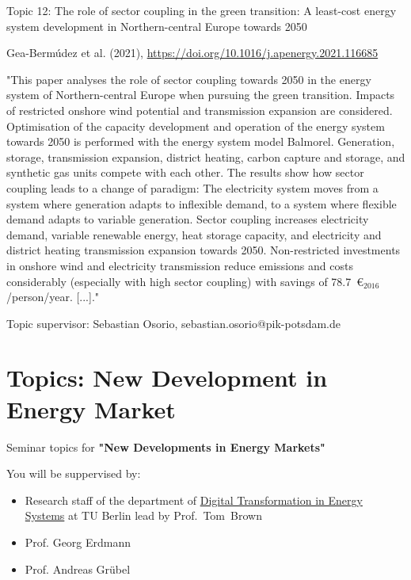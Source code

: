 \documentclass[10pt,aspectratio=169,dvipsnames]{beamer}
\begin{document}
\begin{frame}
  \begin{block}{Topic 12: The role of sector coupling in the green transition: A least-cost energy system development in Northern-central Europe towards 2050}
      
    Gea-Bermúdez et al. (2021), 
    \href{https://doi.org/10.1016/j.apenergy.2021.116685}
    {https://doi.org/10.1016/j.apenergy.2021.116685}
    
    "This paper analyses the role of sector coupling towards 2050 in the energy system of Northern-central Europe when pursuing the green transition. Impacts of restricted onshore wind potential and transmission expansion are considered. Optimisation of the capacity development and operation of the energy system towards 2050 is performed with the energy system model Balmorel. Generation, storage, transmission expansion, district heating, carbon capture and storage, and synthetic gas units compete with each other. The results show how sector coupling leads to a change of paradigm: The electricity system moves from a system where generation adapts to inflexible demand, to a system where flexible demand adapts to variable generation. Sector coupling increases electricity demand, variable renewable energy, heat storage capacity, and electricity and district heating transmission expansion towards 2050. Non-restricted investments in onshore wind and electricity transmission reduce emissions and costs considerably (especially with high sector coupling) with savings of 78.7~€$_{2016}$/person/year. [...]."

    \hfill
    Topic supervisor: Sebastian Osorio, sebastian.osorio@pik-potsdam.de
    
  \end{block}
\end{frame}



\section{Topics: New Development in Energy Market}

\begin{frame}
Seminar topics for {\bf "New Developments in Energy Markets"}

You will be suppervised by:  
    \begin{itemize}
        \item  Research staff of the department of \href{https://www.ensys.tu-berlin.de/menue/overview/}{Digital Transformation in Energy Systems} at TU Berlin lead by Prof.~Tom~Brown
        \item Prof. Georg Erdmann
        \item Prof. Andreas Grübel
    \end{itemize}
\end{frame}
\end{document}
